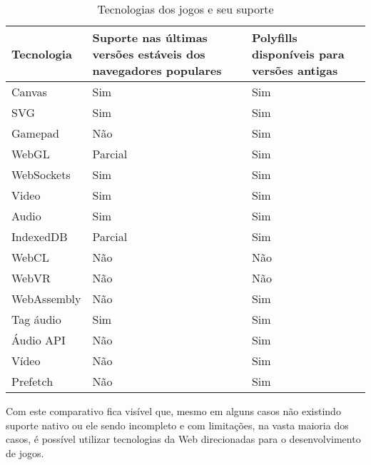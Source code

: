 \begin{table}
\begin{tabular}{ |p{3cm}|p{3cm}|p{3cm}|  }
\hline
Tecnologia & Suporte nas últimas versões estáveis dos navegadores populares & Polyfills disponíveis  para versões antigas \\
\hline
Canvas & Sim & Sim \\
SVG & Sim & Sim \\
Gamepad & Não & Sim \\
WebGL & Parcial & Sim \\
WebSockets & Sim & Sim \\
Video & Sim & Sim \\
Audio & Sim & Sim \\
IndexedDB & Parcial & Sim \\
WebCL & Não & Não \\
WebVR & Não & Não \\
WebAssembly & Não & Sim \\
Tag áudio & Sim & Sim \\
Áudio API & Não & Sim \\
Vídeo & Não & Sim \\
Prefetch & Não & Sim \\
\hline
\end{tabular}
\label{table:technologies}
\caption{Tecnologias dos jogos e seu suporte}
\end{table}

Com este comparativo fica visível que, mesmo em alguns casos não
existindo suporte nativo ou ele sendo incompleto e com limitações,
na vasta maioria dos casos, é possível utilizar tecnologias da Web
direcionadas para o desenvolvimento de jogos.

